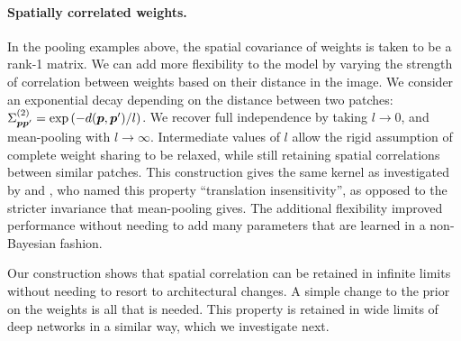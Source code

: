 \documentclass[accepted]{uai2021} %
\newcommand{\priorWcovs}[1]{\Sigma^{(#1)}}
\newcommand{\patch}{\vp}               %
\newcommand{\0}{\boldsymbol{0}}
\newcommand{\1}{\boldsymbol{1}}
\begin{document}

\paragraph{Spatially correlated weights.} In the pooling examples above, the spatial covariance of weights is taken to be a rank-1 matrix. We can add more flexibility to the model by varying the strength of correlation between weights based on their distance in the image. We consider an exponential decay depending on the distance between two patches: $\priorWcovs{2}_{\patch\patch'} = \exp\bra{-d\bra{\patch, \patch'}/l}$. We recover full independence by taking $l\to 0$, and mean-pooling with $l\to\infty$. Intermediate values of $l$ allow the rigid assumption of complete weight sharing to be relaxed, while still retaining spatial correlations between similar patches. This construction gives the same kernel as investigated by \citet{mairal2014ckn} and \citet{dutordoir2020}, who named this property ``translation insensitivity'', as opposed to the stricter invariance that mean-pooling gives. The additional flexibility improved performance without needing to add many parameters that are learned in a non-Bayesian fashion.

Our construction shows that spatial correlation can be retained in infinite limits without needing to resort to architectural changes. A simple change to the prior on the weights is all that is needed. This property is retained in wide limits of deep networks in a similar way, which we investigate next.



\end{document}
